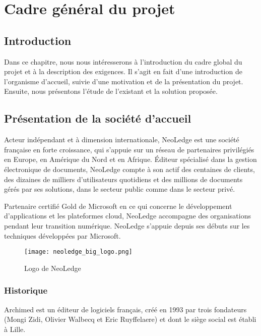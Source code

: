 \chapter{Cadre général du projet}
\label{chap:cadreGeneral}

\section*{Introduction}
Dans ce chapitre, nous nous intéresserons à l'introduction du cadre global du projet et à la description des exigences. Il s'agit en fait d'une introduction de l'organisme d'accueil, suivie d'une motivation et de la présentation du projet. Ensuite, nous présentons l'étude de l'existant et la solution proposée.

\section{Présentation de la société d'accueil}
Acteur indépendant et à dimension internationale, NeoLedge est une société française en forte croissance, qui s'appuie sur un réseau de partenaires privilégiés en Europe, en Amérique du Nord et en Afrique. Éditeur spécialisé dans la gestion électronique de documents, NeoLedge compte à son actif des centaines de clients, des dizaines de milliers d'utilisateurs quotidiens et des millions de documents gérés par ses solutions, dans le secteur public comme dans le secteur privé.

\medskip

Partenaire certifié Gold de Microsoft en ce qui concerne le développement d'applications et les plateformes cloud, NeoLedge accompagne des organisations 
pendant leur transition numérique.
NeoLedge s'appuie depuis ses débuts sur les techniques développées par Microsoft. 

\begin{figure}[!h]
\centering
\texttt{[image: neoledge\_big\_logo.png]}
\caption{Logo de NeoLedge}
\label{fig:logoNeoledge}
\end{figure}

\subsection{Historique}

Archimed est un éditeur de logiciels français, créé en 1993 par trois fondateurs (Mongi Zidi, Olivier Walbecq et Eric Ruyffelaere) et dont le siège social est établi à Lille.
\medskip

